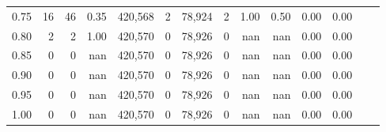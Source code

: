 \begin{tabular}{rrrrrrrrrrrrrr}
0.75 &      16 &      46 &    0.35 &  420,568 &        2 &  78,924 &       2 &  1.00 &  0.50 &  0.00 &      0.00 \\
0.80 &       2 &       2 &    1.00 &  420,570 &        0 &  78,926 &       0 &   nan &   nan &  0.00 &      0.00 \\
0.85 &       0 &       0 &     nan &  420,570 &        0 &  78,926 &       0 &   nan &   nan &  0.00 &      0.00 \\
0.90 &       0 &       0 &     nan &  420,570 &        0 &  78,926 &       0 &   nan &   nan &  0.00 &      0.00 \\
0.95 &       0 &       0 &     nan &  420,570 &        0 &  78,926 &       0 &   nan &   nan &  0.00 &      0.00 \\
1.00 &       0 &       0 &     nan &  420,570 &        0 &  78,926 &       0 &   nan &   nan &  0.00 &      0.00 \\
\bottomrule
\end{tabular}
